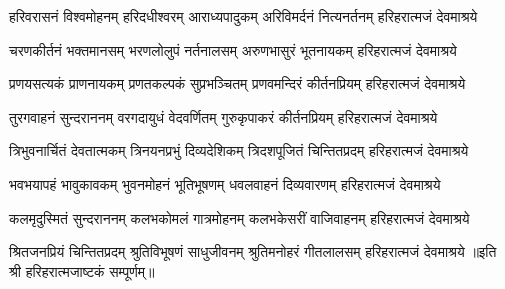 
\fourlineindentedshloka
{हरिवरासनं विश्वमोहनम्}
{हरिदधीश्वरम् आराध्यपादुकम्}
{अरिविमर्दनं नित्यनर्तनम्}
{हरिहरात्मजं देवमाश्रये}

\fourlineindentedshloka
{चरणकीर्तनं भक्तमानसम्}
{भरणलोलुपं नर्तनालसम्}
{अरुणभासुरं भूतनायकम्}
{हरिहरात्मजं देवमाश्रये}

\fourlineindentedshloka
{प्रणयसत्यकं प्राणनायकम्}
{प्रणतकल्पकं सुप्रभञ्चितम्}
{प्रणवमन्दिरं कीर्तनप्रियम्}
{हरिहरात्मजं देवमाश्रये}

\fourlineindentedshloka
{तुरगवाहनं सुन्दराननम्}
{वरगदायुधं वेदवर्णितम्}
{गुरुकृपाकरं कीर्तनप्रियम्}
{हरिहरात्मजं देवमाश्रये}

\fourlineindentedshloka
{त्रिभुवनार्चितं देवतात्मकम्}
{त्रिनयनप्रभुं दिव्यदेशिकम्}
{त्रिदशपूजितं चिन्तितप्रदम्}
{हरिहरात्मजं देवमाश्रये}

\fourlineindentedshloka
{भवभयापहं भावुकावकम्}
{भुवनमोहनं भूतिभूषणम्}
{धवलवाहनं दिव्यवारणम्}
{हरिहरात्मजं देवमाश्रये}

\fourlineindentedshloka
{कलमृदुस्मितं सुन्दराननम्}
{कलभकोमलं गात्रमोहनम्}
{कलभकेसरीं वाजिवाहनम्}
{हरिहरात्मजं देवमाश्रये}

\fourlineindentedshloka
{श्रितजनप्रियं चिन्तितप्रदम्}
{श्रुतिविभूषणं साधुजीवनम्}
{श्रुतिमनोहरं गीतलालसम्}
{हरिहरात्मजं देवमाश्रये}
॥इति श्री हरिहरात्मजाष्टकं सम्पूर्णम्॥